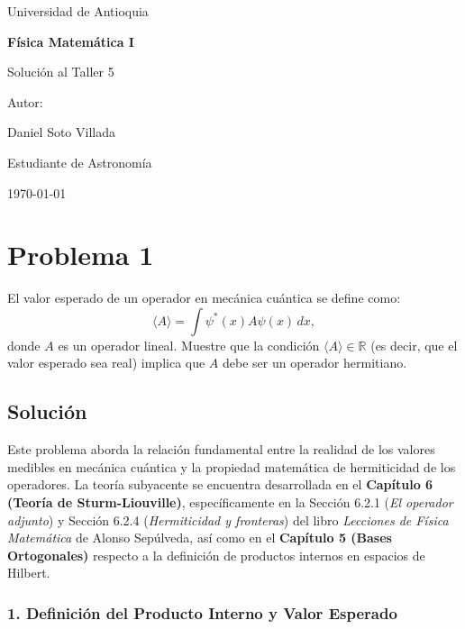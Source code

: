 \documentclass[a4paper]{article}
\begin{document}
\begin{titlepage}
  \centering
  {\Large Universidad de Antioquia\par}
  \vspace{2cm}
  {\huge\bfseries Física Matemática I\par}
  \vspace{0.4cm}
  {\Large Solución al Taller 5 \par}
  \vspace{2.5cm}
  {\large Autor:\par}
  \vspace{0.2cm}
  {\large Daniel Soto Villada\par}
  {\large Estudiante de Astronomía\par}
  \vfill
  {\large \today\par}
\end{titlepage}

\newpage
\tableofcontents
\newpage


\section{Problema 1}
El valor esperado de un operador en mecánica cuántica se define como:
$$
\langle A \rangle = \int \psi^*(x)A\psi(x) \, dx,
$$
donde $A$ es un operador lineal. Muestre que la condición $\langle A \rangle \in \mathbb{R}$ (es decir, que el valor esperado sea real) implica que $A$ debe ser un operador hermitiano.

\subsection{Solución}

Este problema aborda la relación fundamental entre la realidad de los valores medibles en mecánica cuántica y la propiedad matemática de hermiticidad de los operadores. La teoría subyacente se encuentra desarrollada en el \textbf{Capítulo 6 (Teoría de Sturm-Liouville)}, específicamente en la Sección 6.2.1 (\textit{El operador adjunto}) y Sección 6.2.4 (\textit{Hermiticidad y fronteras}) del libro \textit{Lecciones de Física Matemática} de Alonso Sepúlveda, así como en el \textbf{Capítulo 5 (Bases Ortogonales)} respecto a la definición de productos internos en espacios de Hilbert.

\subsubsection{1. Definición del Producto Interno y Valor Esperado}
\end{document}
